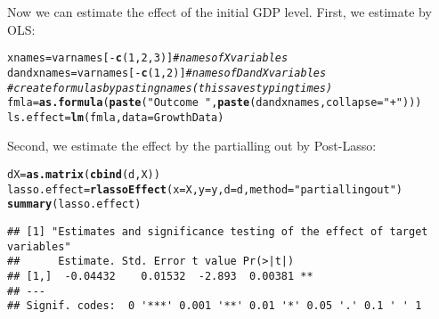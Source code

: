 \documentclass{amsart}\usepackage[]{graphicx}\usepackage[]{color}
\makeatletter
\newcommand{\hlnum}[1]{\textcolor[rgb]{0.686,0.059,0.569}{#1}}%
\newcommand{\hlstr}[1]{\textcolor[rgb]{0.192,0.494,0.8}{#1}}%
\newcommand{\hlcom}[1]{\textcolor[rgb]{0.678,0.584,0.686}{\textit{#1}}}%
\newcommand{\hlopt}[1]{\textcolor[rgb]{0,0,0}{#1}}%
\newcommand{\hlstd}[1]{\textcolor[rgb]{0.345,0.345,0.345}{#1}}%
\newcommand{\hlkwb}[1]{\textcolor[rgb]{0.69,0.353,0.396}{#1}}%
\newcommand{\hlkwc}[1]{\textcolor[rgb]{0.333,0.667,0.333}{#1}}%
\newcommand{\hlkwd}[1]{\textcolor[rgb]{0.737,0.353,0.396}{\textbf{#1}}}%
\newenvironment{kframe}{%
 \def\at@end@of@kframe{}%
 \ifinner\ifhmode%
  \def\at@end@of@kframe{\end{minipage}}%
  \begin{minipage}{\columnwidth}%
 \fi\fi%
 \def\FrameCommand##1{\hskip\@totalleftmargin \hskip-\fboxsep
 \colorbox{shadecolor}{##1}\hskip-\fboxsep
     \hskip-\linewidth \hskip-\@totalleftmargin \hskip\columnwidth}%
 \MakeFramed {\advance\hsize-\width
   \@totalleftmargin\z@ \linewidth\hsize
   \@setminipage}}%
 {\par\unskip\endMakeFramed%
 \at@end@of@kframe}
\newenvironment{knitrout}{}{} %
\makeatother
\begin{document}
Now we can estimate the effect of the initial GDP level. First, we estimate by OLS:
\begin{knitrout}
\color{fgcolor}\begin{kframe}
\begin{alltt}
\hlstd{xnames}\hlkwb{=} \hlstd{varnames[}\hlopt{-}\hlkwd{c}\hlstd{(}\hlnum{1}\hlstd{,}\hlnum{2}\hlstd{,}\hlnum{3}\hlstd{)]} \hlcom{# names of X variables}
\hlstd{dandxnames}\hlkwb{=} \hlstd{varnames[}\hlopt{-}\hlkwd{c}\hlstd{(}\hlnum{1}\hlstd{,}\hlnum{2}\hlstd{)]} \hlcom{# names of D and X variables}
\hlcom{# create formulas by pasting names (this saves typing times)}
\hlstd{fmla}\hlkwb{=} \hlkwd{as.formula}\hlstd{(}\hlkwd{paste}\hlstd{(}\hlstr{"Outcome ~ "}\hlstd{,} \hlkwd{paste}\hlstd{(dandxnames,} \hlkwc{collapse}\hlstd{=} \hlstr{"+"}\hlstd{)))}
\hlstd{ls.effect}\hlkwb{=} \hlkwd{lm}\hlstd{(fmla,} \hlkwc{data}\hlstd{=GrowthData)}
\end{alltt}
\end{kframe}
\end{knitrout}


Second, we estimate the effect by the partialling out by Post-Lasso: 
\begin{knitrout}
\color{fgcolor}\begin{kframe}
\begin{alltt}
\hlstd{dX} \hlkwb{=} \hlkwd{as.matrix}\hlstd{(}\hlkwd{cbind}\hlstd{(d,X))}
\hlstd{lasso.effect} \hlkwb{=} \hlkwd{rlassoEffect}\hlstd{(}\hlkwc{x}\hlstd{=X,} \hlkwc{y}\hlstd{=y,} \hlkwc{d}\hlstd{=d,} \hlkwc{method}\hlstd{=}\hlstr{"partialling out"}\hlstd{)}
\hlkwd{summary}\hlstd{(lasso.effect)}
\end{alltt}
\begin{verbatim}
## [1] "Estimates and significance testing of the effect of target variables"
##      Estimate. Std. Error t value Pr(>|t|)   
## [1,]  -0.04432    0.01532  -2.893  0.00381 **
## ---
## Signif. codes:  0 '***' 0.001 '**' 0.01 '*' 0.05 '.' 0.1 ' ' 1
\end{verbatim}
\end{kframe}
\end{knitrout}
\end{document}
